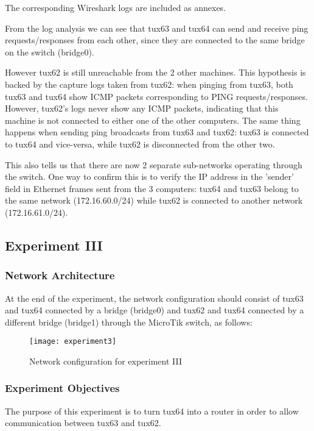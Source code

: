 The corresponding Wireshark logs are included as annexes.

From the log analysis we can see that tux63 and tux64 can send and receive ping requests/responses from each other, since they are connected to the same bridge on the switch (bridge0).

However tux62 is still unreachable from the 2 other machines.
This hypothesis is backed by the capture logs taken from tux62: when pinging from tux63, both tux63 and tux64 show ICMP packets corresponding to PING requests/responses. However, tux62's logs never show any ICMP packets, indicating that this machine is not connected to either one of the other computers.
The same thing happens when sending ping broadcasts from tux63 and tux62: tux63 is connected to tux64 and vice-versa, while tux62 is disconnected from the other two.

This also tells us that there are now 2 separate sub-networks operating through the switch. One way to confirm this is to verify the IP address in the 'sender' field in Ethernet frames sent from the 3 computers: tux64 and tux63 belong to the same network (172.16.60.0/24) while tux62 is connected to another network (172.16.61.0/24).

\subsection{Experiment III}

\subsubsection{Network Architecture}

At the end of the experiment, the network configuration should consist of tux63 and tux64 connected by a bridge (bridge0) and tux62 and tux64 connected by a different bridge (bridge1) through the MicroTik switch, as follows:

\begin{figure}[H]
    \centering
    \texttt{[image: experiment3]}
    \caption{Network configuration for experiment III}
\end{figure}

\subsubsection{Experiment Objectives}

The purpose of this experiment is to turn tux64 into a router in order to allow communication between tux63 and tux62.

